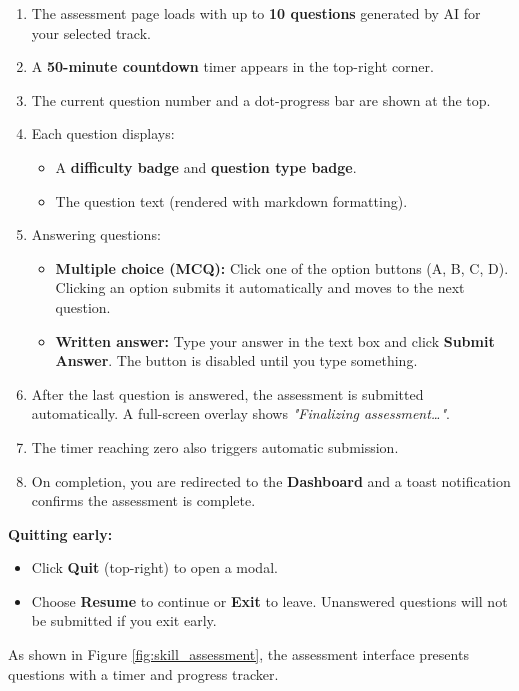 \documentclass{FastFyp}
\begin{document}
\begin{enumerate}
    \item The assessment page loads with up to \textbf{10 questions} generated by AI for your selected track.
    \item A \textbf{50-minute countdown} timer appears in the top-right corner.
    \item The current question number and a dot-progress bar are shown at the top.
    \item Each question displays:
        \begin{itemize}
            \item A \textbf{difficulty badge} and \textbf{question type badge}.
            \item The question text (rendered with markdown formatting).
        \end{itemize}
    \item Answering questions:
        \begin{itemize}
            \item \textbf{Multiple choice (MCQ):} Click one of the option buttons (A, B, C, D). Clicking an option submits it automatically and moves to the next question.
            \item \textbf{Written answer:} Type your answer in the text box and click \textbf{Submit Answer}. The button is disabled until you type something.
        \end{itemize}
    \item After the last question is answered, the assessment is submitted automatically. A full-screen overlay shows \textit{"Finalizing assessment\ldots"}.
    \item The timer reaching zero also triggers automatic submission.
    \item On completion, you are redirected to the \textbf{Dashboard} and a toast notification confirms the assessment is complete.
\end{enumerate}

\noindent\textbf{Quitting early:}
\begin{itemize}
    \item Click \textbf{Quit} (top-right) to open a modal.
    \item Choose \textbf{Resume} to continue or \textbf{Exit} to leave. Unanswered questions will not be submitted if you exit early.
\end{itemize}

As shown in Figure \ref{fig:skill_assessment}, the assessment interface presents questions with a timer and progress tracker.
\end{document}
